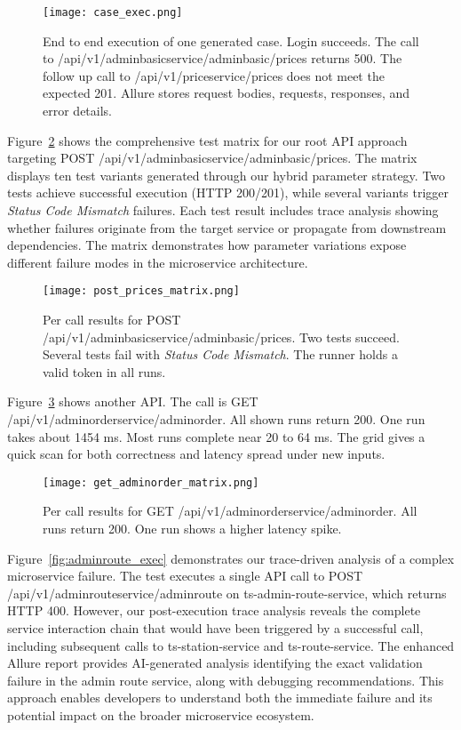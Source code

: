 \documentclass[conference]{IEEEtran}
\begin{document}
\begin{figure}[!t]
\centering
\texttt{[image: case\_exec.png]}
\caption{End to end execution of one generated case. Login succeeds. The call to /api\slash v1\slash adminbasicservice\slash adminbasic\slash prices returns 500. The follow up call to /api\slash v1\slash priceservice\slash prices does not meet the expected 201. Allure stores request bodies, requests, responses, and error details.}
\label{fig:case_exec}
\end{figure}

Figure~\ref{fig:post_prices_matrix} shows the comprehensive test matrix for our root API approach targeting POST /api\slash v1\slash adminbasicservice\slash adminbasic\slash prices. The matrix displays ten test variants generated through our hybrid parameter strategy. Two tests achieve successful execution (HTTP 200/201), while several variants trigger \emph{Status Code Mismatch} failures. Each test result includes trace analysis showing whether failures originate from the target service or propagate from downstream dependencies. The matrix demonstrates how parameter variations expose different failure modes in the microservice architecture.

\begin{figure}[!t]
\centering
\texttt{[image: post\_prices\_matrix.png]}
\caption{Per call results for POST /api\slash v1\slash adminbasicservice\slash adminbasic\slash prices. Two tests succeed. Several tests fail with \emph{Status Code Mismatch}. The runner holds a valid token in all runs.}
\label{fig:post_prices_matrix}
\end{figure}

Figure~\ref{fig:get_adminorder_matrix} shows another API. The call is GET /api\slash v1\slash adminorderservice\slash adminorder. All shown runs return 200. One run takes about 1454 ms. Most runs complete near 20 to 64 ms. The grid gives a quick scan for both correctness and latency spread under new inputs.

\begin{figure}[!t]
\centering
\texttt{[image: get\_adminorder\_matrix.png]}
\caption{Per call results for GET /api\slash v1\slash adminorderservice\slash adminorder. All runs return 200. One run shows a higher latency spike.}
\label{fig:get_adminorder_matrix}
\end{figure}

Figure~\ref{fig:adminroute_exec} demonstrates our trace-driven analysis of a complex microservice failure. The test executes a single API call to POST /api\slash v1\slash adminrouteservice\slash adminroute on ts-admin-route-service, which returns HTTP 400. However, our post-execution trace analysis reveals the complete service interaction chain that would have been triggered by a successful call, including subsequent calls to ts-station-service and ts-route-service. The enhanced Allure report provides AI-generated analysis identifying the exact validation failure in the admin route service, along with debugging recommendations. This approach enables developers to understand both the immediate failure and its potential impact on the broader microservice ecosystem.
\end{document}
